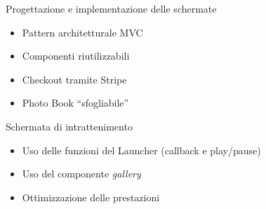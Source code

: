 \begin{frame}{Progettazione e implementazione delle schermate}
\begin{minipage}{0.49\textwidth}
\begin{minipage}{0.32\textwidth}
				\end{minipage}
			\end{minipage}
			\begin{minipage}{0.49\textwidth}
				\begin{itemize}
					\item Pattern architetturale MVC
					\item Componenti riutilizzabili
					\item Checkout tramite Stripe
					\item Photo Book “sfogliabile”
				\end{itemize}
			\end{minipage}\par
			\begin{block}{Schermata di intrattenimento}
				\begin{itemize}
					\item Uso delle funzioni del Launcher (callback e play/pause)
					\item Uso del componente \emph{gallery}
					\item Ottimizzazione delle prestazioni
				\end{itemize}
			\end{block}
		\end{frame}
